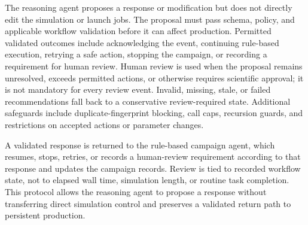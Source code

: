 The reasoning agent proposes a response or modification but does not directly edit the simulation or launch jobs. The proposal must pass schema, policy, and applicable workflow validation before it can affect production. Permitted validated outcomes include acknowledging the event, continuing rule-based execution, retrying a safe action, stopping the campaign, or recording a requirement for human review. Human review is used when the proposal remains unresolved, exceeds permitted actions, or otherwise requires scientific approval; it is not mandatory for every review event. Invalid, missing, stale, or failed recommendations fall back to a conservative review-required state. Additional safeguards include duplicate-fingerprint blocking, call caps, recursion guards, and restrictions on accepted actions or parameter changes.

A validated response is returned to the rule-based campaign agent, which resumes, stops, retries, or records a human-review requirement according to that response and updates the campaign records. Review is tied to recorded workflow state, not to elapsed wall time, simulation length, or routine task completion. This protocol allows the reasoning agent to propose a response without transferring direct simulation control and preserves a validated return path to persistent production.
